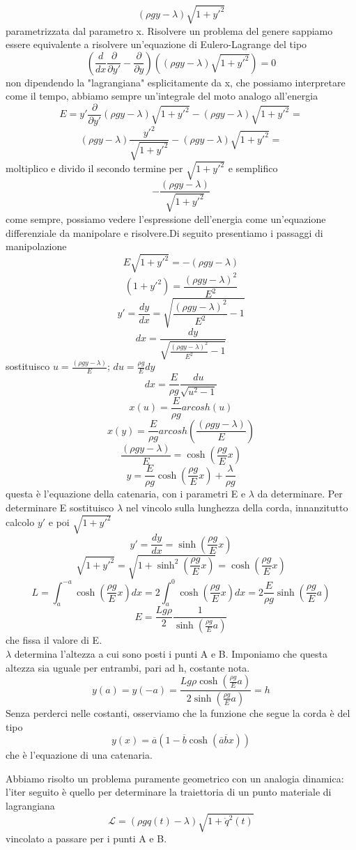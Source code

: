 \documentclass[
10pt, %
a4paper, %
oneside, %
headinclude,footinclude, %
BCOR5mm, %
]{scrartcl}
\begin{document}
\[(\rho g y - \lambda)\sqrt{1+y'^2}\]
parametrizzata dal parametro x. Risolvere un problema del genere sappiamo essere equivalente a risolvere un'equazione di Eulero-Lagrange del tipo
\[\left(\frac{d}{dx}\frac{\partial }{\partial y'}-\frac{\partial}{\partial y}\right) \left((\rho g y - \lambda)\sqrt{1+y'^2}\right) = 0\]
non dipendendo la "lagrangiana" esplicitamente da x, che possiamo interpretare come il tempo, abbiamo sempre un'integrale del moto analogo all'energia
\[E = y'\frac{\partial}{\partial y'}(\rho g y - \lambda)\sqrt{1+y'^2}-(\rho g y - \lambda)\sqrt{1+y'^2} = \]
\[(\rho g y - \lambda)\frac{y'^2}{\sqrt{1+y'^2}}-(\rho g y - \lambda)\sqrt{1+y'^2} = \]
moltiplico e divido il secondo termine per \(\sqrt{1+y'^2}\) e semplifico
\[-\frac{(\rho g y - \lambda)}{\sqrt{1+y'^2}}\]
come sempre, possiamo vedere l'espressione dell'energia come un'equazione differenziale da manipolare e risolvere.Di seguito presentiamo i passaggi di manipolazione
\[E\sqrt{1+y'^2} = -(\rho g y - \lambda)\]
\[(1+y'^2) = \frac{(\rho g y - \lambda)^2}{E^2}\]
\[y'= \frac{dy}{dx} = \sqrt{\frac{(\rho g y - \lambda)^2}{E^2}-1}\]
\[dx = \frac{dy}{\sqrt{\frac{(\rho g y - \lambda)^2}{E^2}-1}}\]
sostituisco \(u = \frac{(\rho gy-\lambda)}{E}\); \(du = \frac{\rho g}{E}dy\)
\[dx  = \frac{E}{\rho g}\frac{du}{\sqrt{u^2-1}}\]
\[x(u) = \frac{E}{\rho g}arcosh(u) \]
\[x(y) = \frac{E}{\rho g}arcosh(\frac{(\rho gy-\lambda)}{E})\]
\[\frac{(\rho gy-\lambda)}{E} = \cosh(\frac{\rho g}{E}x)\]
\[y  = \frac{E}{\rho g}\cosh(\frac{\rho g}{E}x)+\frac{\lambda}{\rho g}\]
questa è l'equazione della catenaria, con i parametri E e \(\lambda\) da determinare. Per determinare E sostituisco $\lambda$ nel vincolo sulla lunghezza della corda, innanzitutto calcolo \(y'\) e poi $\sqrt{1+y'^2}$
\[y' = \frac{dy}{dx} = \sinh(\frac{\rho g}{E}x)\]
\[\sqrt{1+y'^2} = \sqrt{1+\sinh^2(\frac{\rho g}{E}x)} = \cosh(\frac{\rho g}{E}x) \]
\[L = \int_{a}^{-a}\cosh(\frac{\rho g}{E}x)dx = 2\int_{a}^{0}\cosh(\frac{\rho g}{E}x)dx = 2\frac{E}{\rho g}\sinh(\frac{\rho g}{E}a)\]
\[E = \frac{Lg\rho}{2}\frac{1}{\sinh(\frac{\rho g}{E}a)}\]
che fissa il valore di E. \\
$\lambda$ determina l'altezza a cui sono posti i punti A e B. Imponiamo che questa altezza sia uguale per entrambi, pari ad h, costante nota.
\[y(a) = y(-a) = \frac{Lg\rho\cosh(\frac{\rho g}{E}a)}{2\sinh(\frac{\rho g}{E}a)} = h\] 
 Senza perderci nelle costanti, osserviamo che la funzione che segue la corda è del tipo
\[y(x) = \overline{a}\left(1-\overline{b}\cosh(\overline{a}\overline{b}x)\right)\]
che è l'equazione di una catenaria.
\begin{osservazione}
	Abbiamo risolto un problema puramente geometrico con un analogia dinamica: l'iter seguito è quello per determinare la traiettoria di un punto materiale di lagrangiana
	\[\mathcal{L} = (\rho g q(t) - \lambda)\sqrt{1+\dot{q}^2(t)}\]
	vincolato a passare per i punti A e B.
\end{osservazione}
\end{document}
